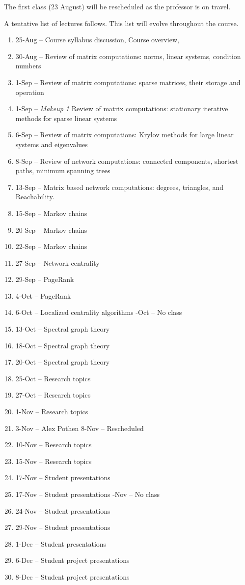 \documentclass{article}
\begin{document}
The first class (23 August) will be rescheduled as the professor is on travel.

A tentative list of lectures follows. This list will evolve throughout the course.

\begin{enumerate}%
\item 25-Aug --{} Course syllabus discussion, Course overview,
\item 30-Aug --{} Review of matrix computations: norms, linear systems, condition numbers
\item 1-Sep --{} Review of matrix computations: sparse matrices, their storage and operation
\item 1-Sep --{} \emph{Makeup 1} Review of matrix computations: stationary iterative methods for sparse linear systems
\item 6-Sep --{} Review of matrix computations: Krylov methods for large linear systems and eigenvalues
\item 8-Sep --{} Review of network computations: connected components, shortest paths, minimum spanning trees
\item 13-Sep --{} Matrix based network computations: degrees, triangles, and Reachability.
\item 15-Sep --{} Markov chains
\item 20-Sep --{} Markov chains
\item 22-Sep --{} Markov chains
\item 27-Sep --{} Network centrality
\item 29-Sep --{} PageRank
\item 4-Oct --{} PageRank
\item 6-Oct --{} Localized centrality algorithms -Oct --{} No class
\item 13-Oct --{} Spectral graph theory
\item 18-Oct --{} Spectral graph theory
\item 20-Oct --{} Spectral graph theory
\item 25-Oct --{} Research topics
\item 27-Oct --{} Research topics
\item 1-Nov --{} Research topics
\item 3-Nov --{} Alex Pothen 8-Nov --{} Rescheduled
\item 10-Nov --{} Research topics
\item 15-Nov --{} Research topics
\item 17-Nov --{} Student presentations
\item 17-Nov --{} Student presentations -Nov --{} No class
\item 24-Nov --{} Student presentations
\item 29-Nov --{} Student presentations
\item 1-Dec --{} Student presentations
\item 6-Dec --{} Student project presentations
\item 8-Dec --{} Student project presentations

\end{enumerate}
\end{document}
